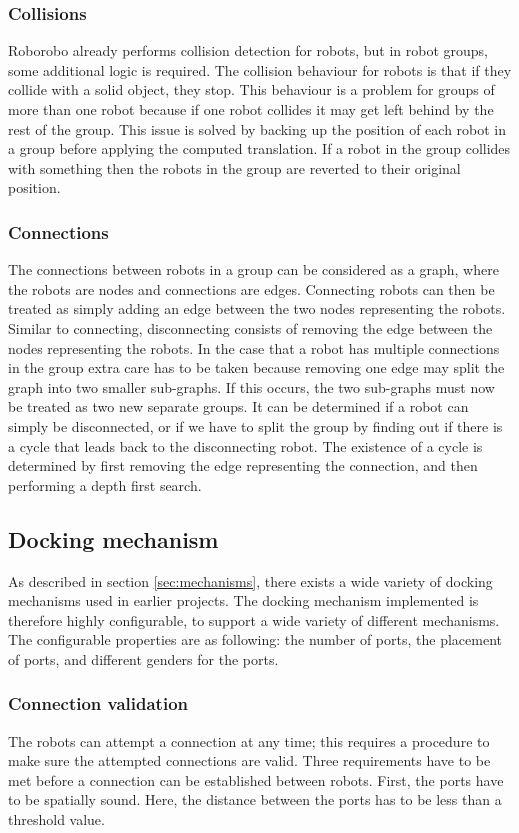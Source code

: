 \subsubsection{Collisions}
Roborobo already performs collision detection for robots, but in robot groups, some additional logic is required.
The collision behaviour for robots is that if they collide with a solid object, they stop.
This behaviour is a problem for groups of more than one robot because if one robot collides it may get left behind by the rest of the group.
This issue is solved by backing up the position of each robot in a group before applying the computed translation.
If a robot in the group collides with something then the robots in the group are reverted to their original position.

\subsubsection{Connections}
The connections between robots in a group can be considered as a graph, where the robots are nodes and connections are edges.
Connecting robots can then be treated as simply adding an edge between the two nodes representing the robots.
Similar to connecting, disconnecting consists of removing the edge between the nodes representing the robots.
In the case that a robot has multiple connections in the group extra care has to be taken because removing one edge may split the graph into two smaller sub-graphs.
If this occurs, the two sub-graphs must now be treated as two new separate groups.
It can be determined if a robot can simply be disconnected, or if we have to split the group by finding out if there is a cycle that leads back to the disconnecting robot.
The existence of a cycle is determined by first removing the edge representing the connection, and then performing a depth first search.
	 
\subsection{Docking mechanism}
As described in section \ref{sec:mechanisms}, there exists a wide variety of docking mechanisms used in earlier projects.
The docking mechanism implemented is therefore highly configurable, to support a wide variety of different mechanisms.
The configurable properties are as following: the number of ports, the placement of ports, and different genders for the ports. 

\subsubsection{Connection validation}
The robots can attempt a connection at any time; this requires a procedure to make sure the attempted connections are valid.
Three requirements have to be met before a connection can be established between robots.
First, the ports have to be spatially sound. 
Here, the distance between the ports has to be less than a threshold value.

